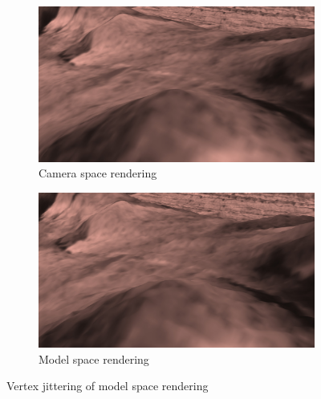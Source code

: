 \begin{figure}[h]
    \centering
    \begin{subfigure}[bt]{0.48\textwidth}
        \includegraphics[width=\textwidth]{figures/results/camspace.jpg}
        \caption{Camera space rendering}
    \end{subfigure}
    \begin{subfigure}[bt]{0.48\textwidth}
        \includegraphics[width=\textwidth]{figures/results/modelspace.jpg}
        \caption{Model space rendering}
    \end{subfigure}
    \caption{Vertex jittering of model space rendering}
    \label{fig:camspacemodelspace}
\end{figure}


\FloatBarrier
